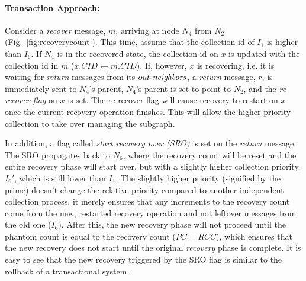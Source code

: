 \paragraph{Transaction Approach:}
Consider a \emph{recover} message, $m$, arriving at node $N_4$ from $N_2$ (Fig.~\ref{fig:recoverycount}). This time, assume that the
collection id of $I_1$ is higher than $I_6$. %
If $N_4$ is in the recovered
state, the collection id on $x$ is updated with the collection id in $m$
($x.CID \leftarrow m.CID$).  If, however, $x$ is recovering, i.e.
it is waiting for \emph{return} messages from its $\mathop{\mbox{$out$-$\mathit{neighbors}$}}$, a \emph{return} message, $r$, is immediately sent to $N_4$'s
parent, $N_4$'s parent is set to point to $N_2$, and the
\emph{re-recover flag} on $x$ is set. %
The re-recover flag will cause recovery to restart on $x$ once the
current recovery operation finishes. This will allow the higher priority
collection to take over managing the subgraph.

In addition, a flag called \emph{start recovery over (SRO)} is set on the
\emph{return} message.
The SRO propagates back to $N_6$, where the recovery count will
be reset and the entire recovery phase will start over,
but with a slightly
higher collection priority, $I_6'$, which is still lower than $I_1$.  The slightly higher priority
(signified by the prime)
doesn't change the relative priority compared to another independent collection process, it merely
ensures that any
increments to the recovery count come from the new, restarted recovery
operation and not leftover messages from the old one ($I_6$).
After this, the new recovery phase
will not proceed until the phantom count is equal to the recovery count ($PC = RCC$), which ensures that the new recovery
does not start until the original \emph{recovery} phase is complete.
It is easy to see that the new recovery
triggered by the SRO flag is similar to the rollback of a transactional system.


